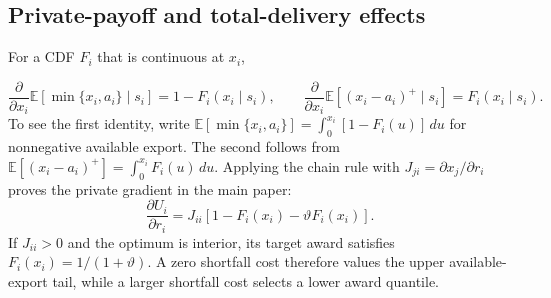 \documentclass[11pt]{article}
\begin{document}
\subsection{Private-payoff and total-delivery effects}
\label{supp:full_private_feeder_proof}

For a CDF $F_i$ that is continuous at $x_i$,

\begin{equation}
\frac{\partial}{\partial x_i}
\mathbb E[\min\{x_i,a_i\}\mid s_i]
=1-F_i(x_i\mid s_i),
\qquad
\frac{\partial}{\partial x_i}
\mathbb E[(x_i-a_i)^+\mid s_i]
=F_i(x_i\mid s_i).
\label{eq:supp_expected_delivery_derivatives}
\end{equation}
To see the first identity, write
$\mathbb E[\min\{x_i,a_i\}]=\int_0^{x_i}[1-F_i(u)]\,du$ for nonnegative
available export. The second follows from
$\mathbb E[(x_i-a_i)^+]=\int_0^{x_i}F_i(u)\,du$. Applying the chain rule with
$J_{ji}=\partial x_j/\partial r_i$ proves the private gradient in the main
paper:
\begin{equation}
\frac{\partial U_i}{\partial r_i}
=J_{ii}\left[1-F_i(x_i)-\vartheta F_i(x_i)\right].
\label{eq:supp_private_request_gradient}
\end{equation}
If $J_{ii}>0$ and the optimum is interior, its target award satisfies
$F_i(x_i)=1/(1+\vartheta)$. A zero shortfall cost therefore values the upper
available-export tail, while a larger shortfall cost selects a lower award quantile.
\end{document}
